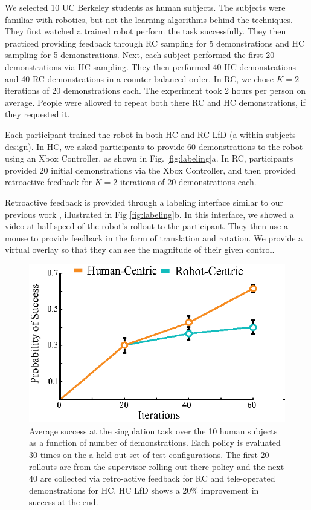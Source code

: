 \documentclass[10pt, conference]{ieeeconf}      %
\begin{document}
We selected 10 UC Berkeley students as human subjects. The subjects were familiar with robotics, but not the learning algorithms behind the techniques. They first watched a trained robot perform the task successfully.  They then practiced providing feedback through RC sampling for 5 demonstrations and HC sampling for 5 demonstrations. Next, each subject performed the first 20 demonstrations via HC sampling. They then performed 40 HC demonstrations and 40 RC demonstrations in a counter-balanced order. In RC, we chose $K=2$ iterations of 20 demonstrations each. The experiment took 2 hours per person on average. People were allowed to repeat both there RC and HC demonstrations, if they requested it. 

Each participant trained the robot in both HC and RC LfD (a within-subjects design). In HC, we asked participants to provide 60 demonstrations to the robot using an Xbox Controller, as shown in Fig. \ref{fig:labeling}a. In RC, participants provided 20 initial demonstrations via the Xbox Controller, and then provided retroactive feedback for $K=2$ iterations of 20 demonstrations each.

Retroactive feedback is provided through a labeling interface similar to our previous work \cite{laskeyrobot}, illustrated in Fig \ref{fig:labeling}b. In this interface, we showed a video at half speed of the robot's rollout to the participant. They then use a mouse to provide feedback in the form of translation and rotation. We provide a virtual overlay so that they can see the magnitude of their given control. 



\begin{figure}
\centering
\includegraphics{f_figs/izzy_reward.eps}
\caption{
    \footnotesize
Average success at the singulation task over the 10 human subjects as a function of number of demonstrations. Each policy is evaluated 30 times on the a held out set of test configurations. The first 20 rollouts are from the supervisor rolling out there policy and the next 40 are collected via retro-active feedback for RC and tele-operated demonstrations for HC. HC LfD shows a 20$\%$ improvement in success at the end. }
\vspace*{-8pt}

\label{fig:izzy_rw}
\end{figure}
\end{document}

